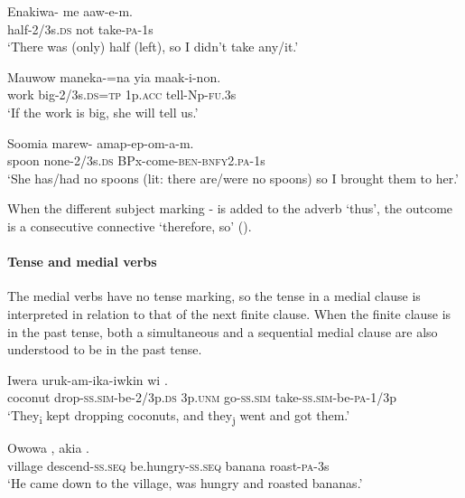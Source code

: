 \ea%
\label{ex:3:x250}
\gll Enakiwa- me aaw-e-m. \\
half-2/3s.\textsc{ds} not take-\textsc{pa}-1s \\
\glt`There was (only) half (left), so I didn't take any/it.'
\z

\ea%
\label{ex:3:x251}
\gll Mauwow maneka-=na yia maak-i-non. \\
work big-2/3s.\textsc{ds}=\textsc{tp} 1p.\textsc{acc} tell-Np-\textsc{fu}.3s \\
\glt`If the work is big, she will tell us.'
\z

\ea%
\label{ex:3:x252}
\gll Soomia marew- amap-ep-om-a-m. \\
spoon none-2/3s.\textsc{ds} BPx-come-\textsc{ben}-\textsc{bnfy}2.\textsc{pa}-1s \\
\glt`She has/had no spoons (lit: there are/were no spoons) so I brought them to her.'
\z

When the different subject marking \nobreakdash- is added to the adverb  `thus', the outcome is a consecutive connective `therefore, so' ().

\paragraph{Tense and medial verbs}\label{sec:3:a:z:y:x}
{}
The medial verbs have no tense marking, so the tense in a medial clause is interpreted in relation to that of the next finite clause. When the finite clause is in the past tense, both a simultaneous  and a sequential medial clause  are also understood to be in the past tense.

\ea%
\label{ex:3:x1025}
\gll Iwera uruk-am-ika-iwkin wi  .\\
coconut drop-\textsc{ss}.\textsc{sim}-be-2/3p.\textsc{ds} 3p.\textsc{unm} go-\textsc{ss}.\textsc{sim} take-\textsc{ss}.\textsc{sim}-be-\textsc{pa}-1/3p\\
\glt`They\textsubscript{i} kept dropping coconuts, and they\textsubscript{j} went and got them.'
\z

\ea%
\label{ex:3:x1023}
\gll Owowa  , akia . \\
village descend-\textsc{ss}.\textsc{seq} be.hungry-\textsc{ss}.\textsc{seq} banana roast-\textsc{pa}-3s\\
\glt`He came down to the village, was hungry and roasted bananas.'
\z

